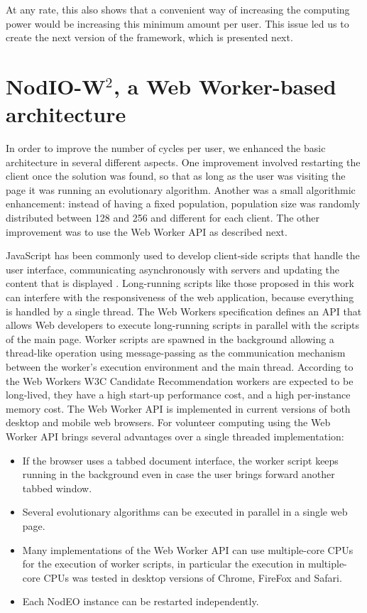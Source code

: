 \documentclass[journal,onecolumn]{IEEEtran}
\begin{document}
At any rate, this also shows that a convenient way of increasing the
computing power would be increasing this minimum amount per user. This
issue led us to create the next version of the framework, which is
presented next. %

\section{{\sf NodIO-W$^2$}, a Web Worker-based architecture}
\label{sec:w2}

In order to improve the number of cycles per user, we enhanced the
basic architecture in several different aspects.  One improvement 
involved restarting the client once the solution was
found, so that as long as the user was visiting the page it was
running an evolutionary algorithm. Another was a small algorithmic
enhancement: instead of having a fixed population,
population size was randomly distributed between 128 and 256 and
different for each client.  The other improvement was to 
use the Web Worker API as described next.

JavaScript has been commonly used to develop client-side scripts
that handle the user interface, communicating asynchronously with servers and
updating the content that is displayed \cite{flanagan2006javascript}.
Long-running scripts like those proposed in this work can interfere with the
responsiveness of the web application, because everything is handled by a
single thread. The Web Workers specification \cite{hickson2012web} defines an
API that allows Web developers to execute long-running scripts in parallel
with the scripts of the main page. Worker scripts are spawned in the
background allowing a thread-like operation using message-passing as the
communication mechanism between the worker's execution environment and the
main thread. According to the Web Workers W3C Candidate Recommendation
\cite{hickson2012web} workers are expected to be long-lived, they have a high
start-up performance cost, and a high per-instance memory cost. The Web Worker
API is implemented in current versions of both desktop and mobile web browsers.
For volunteer computing using the Web Worker API brings several advantages
over a single threaded implementation:

\begin{itemize}
\item If the browser uses a tabbed document interface, the worker script
keeps running in the background even in case the user brings forward another tabbed
window.
\item Several evolutionary algorithms can be executed in parallel in a single web
page. 
\item Many implementations of the Web Worker API can use multiple-core CPUs for
the execution of worker scripts, in particular the execution in multiple-core CPUs
was tested in desktop versions of Chrome, FireFox and Safari.
\item Each {\sf NodEO} instance can be restarted independently.
\end{itemize}
\end{document}
